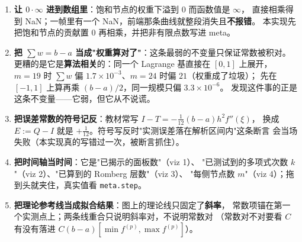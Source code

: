 \begin{enumerate}
        $2\lceil t^\ast/h\rceil+1$，实测 $h=2^{-3},2^{-4},2^{-5}$ 分别是 $53,103,205$。
  \item \textbf{让 $0\cdot\infty$ 进到数组里}：饱和节点的权重下溢到 $0$ 而函数值是 $\infty$，
        直接相乘得到 NaN；一帧里有一个 NaN，前端那条曲线就整段消失且\textbf{不报错}。
        本实现先把饱和节点的贡献置 $0$ 再相乘，并把非有限点数写进 meta。
  \item \textbf{把 $\sum w=b-a$ 当成"权重算对了"}：这条最弱的不变量只保证常数被积对。
        更糟的是它是\textbf{算法相关}的：同一个 Lagrange 基直接在 $[0,1]$ 上展开，
        $m=19$ 时 $\sum w$ 偏 $1.7\times10^{-3}$、$m=24$ 时偏 $21$（权重成了垃圾）；
        先在 $[-1,1]$ 上算再乘 $(b-a)/2$，同一规模只偏 $3.3\times10^{-6}$。
        发现这件事的正是这条不变量——它弱，但它从不说谎。
  \item \textbf{把误差常数的符号记反}：教材常写 $I-T=-\tfrac1{12}(b-a)h^2f''(\xi)$，
        换成 $E:=Q-I$ 就是 $+\tfrac1{12}$。符号写反时"实测误差落在解析区间内"这条断言
        会当场失败（本实现真的写错过一次，被断言抓住）。
  \item \textbf{把时间轴当时间}：它是"已揭示的面板数"（viz 1）、
        "已测试到的多项式次数 $k$"（viz 2）、"已算到的 Romberg 层数"（viz 3）、
        "每侧节点数 $m$"（viz 4）；拖到头就夹住，真实值看 \texttt{meta.step}。
  \item \textbf{把理论参考线当成拟合结果}：图上的理论线只固定了\textbf{斜率}，
        常数项锚在第一个实测点上；两条线重合只说明斜率对，不说明常数对
        （常数对不对要看 $C$ 有没有落进 $C(b-a)[\min f^{(p)},\max f^{(p)}]$）。
\end{enumerate}
